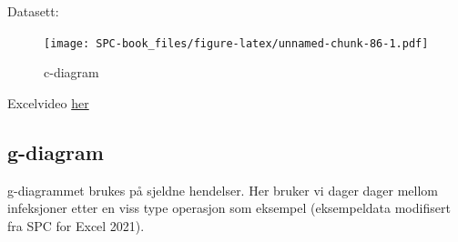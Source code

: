 \documentclass[
]{book}
\begin{document}
Datasett:

\begin{figure}
\centering
\texttt{[image: SPC-book\_files/figure-latex/unnamed-chunk-86-1.pdf]}
\caption{\label{fig:unnamed-chunk-86}c-diagram}
\end{figure}

Excelvideo \href{https://vimeo.com/624307745}{her}

\hypertarget{g-diagram}{%
\subsection{g-diagram}\label{g-diagram}}

g-diagrammet brukes på sjeldne hendelser. Her bruker vi dager dager mellom infeksjoner etter en viss type operasjon som eksempel (eksempeldata modifisert fra SPC for Excel 2021).

\providecommand{\docline}[3]{\noalign{\global\setlength{\arrayrulewidth}{#1}}\arrayrulecolor[HTML]{#2}\cline{#3}}

\setlength{\tabcolsep}{2pt}

\renewcommand*{\arraystretch}{1.5}
\end{document}
